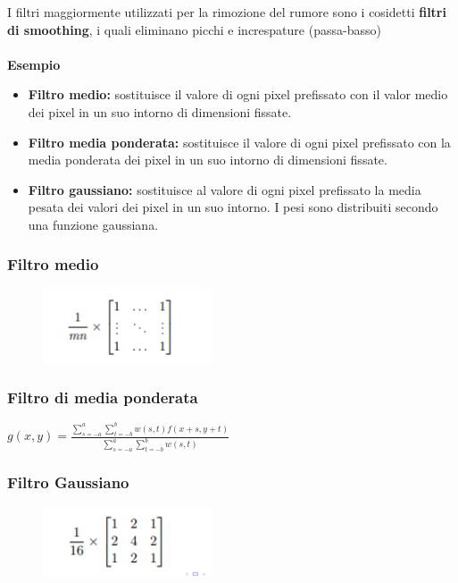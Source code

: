 I filtri maggiormente utilizzati per la rimozione del rumore sono i cosidetti \textbf{filtri di smoothing}, i quali eliminano picchi e increspature (passa-basso)
\\\\
\textbf{Esempio}

\begin{itemize}
    \item \textbf{Filtro medio:} sostituisce il valore di ogni pixel prefissato con il
          valor medio dei pixel in un suo intorno di dimensioni fissate.
    \item \textbf{Filtro media ponderata:} sostituisce il valore di ogni pixel prefissato con la media ponderata dei pixel in un suo
          intorno di dimensioni fissate.
    \item \textbf{Filtro gaussiano:} sostituisce al valore di ogni pixel prefissato la
          media pesata dei valori dei pixel in un suo intorno. I pesi sono distribuiti secondo una funzione gaussiana.
\end{itemize}

\subsubsection{Filtro medio}

\begin{figure}[H]
    \centering
    \includegraphics[width=5cm, keepaspectratio]{capitoli/immagini/imgs/filtro-medio.png}
\end{figure}

\subsubsection{Filtro di media ponderata}

\begin{center}
    $g(x,y)=\frac{\sum_{s=-a}^{a}\sum_{t=-b}^{b}w(s,t)f(x+s,y+t)}{\sum_{s=-a}^{a}\sum_{t=-b}^{b}w(s,t)}$
\end{center}

\subsubsection{Filtro Gaussiano}

\begin{figure}[H]
    \centering
    \includegraphics[width=5cm, keepaspectratio]{capitoli/immagini/imgs/filtro-gaussiano.png}
\end{figure}


